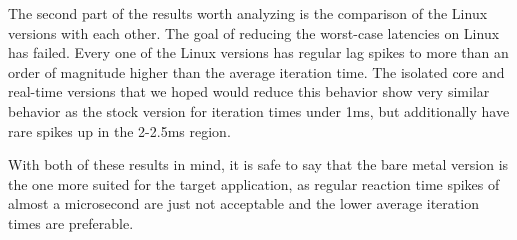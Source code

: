 The second part of the results worth analyzing is the comparison of the Linux versions with each other.
The goal of reducing the worst-case latencies on Linux has failed.
Every one of the Linux versions has regular lag spikes to more than an order of magnitude higher than the average iteration time.
The isolated core and real-time versions that we hoped would reduce this behavior show very similar behavior as the stock version for iteration times under 1ms,
but additionally have rare spikes up in the 2-2.5ms region.

With both of these results in mind, it is safe to say that the bare metal version is the one more suited for the target application,
as regular reaction time spikes of almost a microsecond are just not acceptable and the lower average iteration times are preferable.
